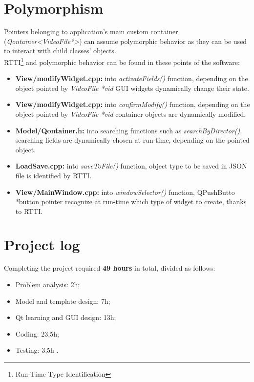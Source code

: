 \section{Polymorphism}

Pointers belonging to application's main custom container (\emph{Qontainer<VideoFile*>}) can assume polymorphic behavior as they can be used to interact with child classes' objects.\\
RTTI\footnote{Run-Time Type Identification} and polymorphic behavior can be found in these points of the software:
\begin{itemize}
\item \textbf{View/modifyWidget.cpp:} into \emph{activateFields()} function, depending on the object pointed by \emph{VideoFile *vid} GUI widgets dynamically change their state.
\item \textbf{View/modifyWidget.cpp:} into \emph{confirmModify()} function, depending on the object pointed by \emph{VideoFile *vid} container objects are dynamically modified.
\item \textbf{Model/Qontainer.h:} into searching functions such as \emph{searchByDirector()}, searching fields are dynamically chosen at run-time, depending on the pointed object.
\item \textbf{LoadSave.cpp:} into \emph{saveToFile()} function, object type to be saved in JSON file is identified by RTTI.
\item \textbf{View/MainWindow.cpp:} into \emph{windowSelector()} function, QPushButto *button pointer recognize at run-time which type of widget to create, thanks to RTTI.
\end{itemize}

\pagebreak

\section{Project log}

Completing the project required \textbf{49 hours} in total, divided as follows:
\begin{itemize}
\item Problem analysis: 2h;
\item Model and template design: 7h;
\item Qt learning and GUI design: 13h;
\item Coding: 23,5h;
\item Testing: 3,5h .
\end{itemize}